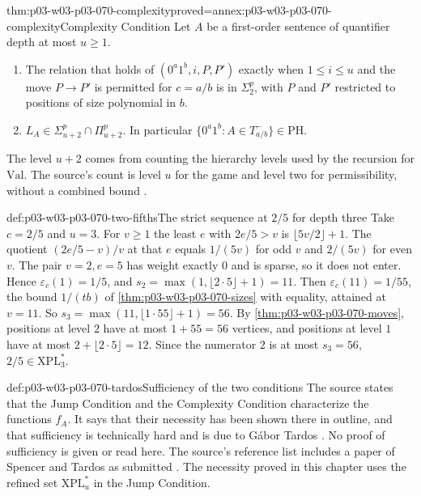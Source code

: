 \begin{hbtheorem}{thm:p03-w03-p03-070-complexity}{proved=annex:p03-w03-p03-070-complexity}{Complexity Condition}
Let \(A\) be a first-order sentence of quantifier depth at most \(u\geq1\).
\begin{enumerate}
\item The relation that holds of \((0^a1^b,i,P,P')\) exactly when \(1\leq i\leq u\)
      and the move \(P\to P'\) is permitted for \(c=a/b\) is in
      \(\Sigma^p_2\), with \(P\) and \(P'\) restricted to positions of size
      polynomial in \(b\).
\item \(L_A\in\Sigma^p_{u+2}\cap\Pi^p_{u+2}\).  In particular
      \(\{0^a1^b:A\in T^-_{a/b}\}\in\mathrm{PH}\).
\end{enumerate}
\end{hbtheorem}

The level \(u+2\) comes from counting the hierarchy levels used by the
recursion for \(\mathrm{Val}\).  The source's count is level \(u\) for the game
and level two for permissibility, without a combined bound
\cite[pp.~20--21]{Spencer2007LogicRandomStructuresAuthor}.

\begin{hbexample}{def:p03-w03-p03-070-two-fifths}{The strict sequence at \(2/5\) for depth three}
Take \(c=2/5\) and \(u=3\).  For \(v\geq1\) the least \(e\) with
\(2e/5>v\) is \(\lfloor5v/2\rfloor+1\).  The quotient
\((2e/5-v)/v\) at that \(e\) equals \(1/(5v)\) for odd \(v\) and \(2/(5v)\)
for even \(v\).  The pair \(v=2,e=5\) has weight exactly \(0\) and is
sparse, so it does not enter.  Hence \(\varepsilon_c(1)=1/5\), and
\(s_2=\max(1,\lfloor2\cdot5\rfloor+1)=11\).  Then
\(\varepsilon_c(11)=1/55\), the bound \(1/(tb)\) of
\cref{thm:p03-w03-p03-070-sizes} with equality, attained at \(v=11\).  So
\(s_3=\max(11,\lfloor1\cdot55\rfloor+1)=56\).  By
\cref{thm:p03-w03-p03-070-moves}, positions at level \(2\) have at most
\(1+55=56\) vertices, and positions at level \(1\) have at most
\(2+\lfloor2\cdot5\rfloor=12\).  Since the numerator \(2\) is at most
\(s_3=56\), \(2/5\in\mathrm{XPL}^\ast_3\).
\end{hbexample}

\begin{proofboundary}{def:p03-w03-p03-070-tardos}{Sufficiency of the two conditions}
The source states that the Jump Condition and the Complexity Condition
characterize the functions \(f_A\).  It says that their necessity has been
shown there in outline, and that sufficiency is technically hard and is due
to G\'abor Tardos \cite[p.~21]{Spencer2007LogicRandomStructuresAuthor}.  No
proof of sufficiency is given or read here.  The source's reference list
includes a paper of Spencer and Tardos as submitted
\cite[p.~30]{Spencer2007LogicRandomStructuresAuthor}.  The necessity proved
in this chapter uses the refined set \(\mathrm{XPL}^\ast_u\) in the Jump
Condition.
\end{proofboundary}


